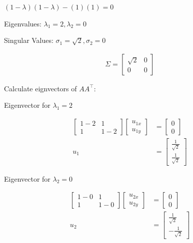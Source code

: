 \documentclass[11pt,letterpaper]{article}
\begin{document}
\begin{enumerate}
\( (1 - \lambda)(1 - \lambda)-(1)(1) = 0 \)

Eigenvalues: \( \lambda_1 = 2, \lambda_2 = 0 \)

Singular Values: \( \sigma_1 = \sqrt{2}, \sigma_2 = 0 \)

\begin{align*}
\Sigma = {\begin{bmatrix}
        \sqrt{2} & 0 \\
        0 & 0
    \end{bmatrix}}
\end{align*}

Calculate eignvectors of \( AA^\top \):

Eigenvector for \( \lambda_1 = 2 \)

\begin{align*}
    \begin{bmatrix}
        1-2 & 1 \\
        1 & 1-2
    \end{bmatrix}
    \begin{bmatrix}
        u_{1x} \\ u_{1y}
    \end{bmatrix}
    &= \begin{bmatrix}
        0 \\ 0
    \end{bmatrix} \\
    u_1
    &= \begin{bmatrix}
        \frac{1}{\sqrt{2}} \\ \frac{1}{\sqrt{2}}
    \end{bmatrix}
\end{align*}

Eigenvector for \( \lambda_2 = 0 \)

\begin{align*}
    \begin{bmatrix}
        1-0 & 1 \\
        1 & 1-0
    \end{bmatrix}
    \begin{bmatrix}
        u_{2x} \\ u_{2y}
    \end{bmatrix}
    &= \begin{bmatrix}
        0 \\ 0
    \end{bmatrix} \\
    u_2
    &= \begin{bmatrix}
        \frac{1}{\sqrt{2}} \\ -\frac{1}{\sqrt{2}}
    \end{bmatrix}
\end{align*}


\end{enumerate}
\end{document}
